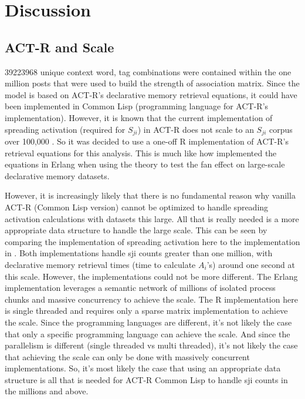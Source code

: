 \documentclass[10pt,letterpaper]{article}
\begin{document}
\section{Discussion}

\subsection{ACT-R and Scale}
\num{39223968} unique context word, tag combinations were contained within the one million posts that were used to build the strength of association matrix.
Since the model is based on ACT-R's declarative memory retrieval equations, it could have been implemented in Common Lisp (programming language for ACT-R's implementation).
However, it is known that the current implementation of spreading activation (required for $S_{ji}$) in ACT-R does not scale to an $S_{ji}$ corpus over 100,000 \cite{Douglass2010, Douglass2009}.
So it was decided to use a one-off R implementation of ACT-R's retrieval equations for this analysis.
This is much like how  implemented the equations in Erlang when using the theory to test the fan effect on large-scale declarative memory datasets.

However, it is increasingly likely that there is no fundamental reason why vanilla ACT-R (Common Lisp version) cannot be optimized to handle spreading activation calculations with datasets this large.
All that is really needed is a more appropriate data structure to handle the large scale.
This can be seen by comparing the implementation of spreading activation here to the implementation in .
Both implementations handle sji counts greater than one million, with declarative memory retrieval times (time to calculate $A_{i}$'s) around one second at this scale.
However, the implementations could not be more different.
The Erlang implementation leverages a semantic network of millions of isolated process chunks and massive concurrency to achieve the scale.
The R implementation here is single threaded and requires only a sparse matrix implementation to achieve the scale.
Since the programming languages are different, it's not likely the case that only a specific programming language can achieve the scale.
And since the parallelism is different (single threaded vs multi threaded), it's not likely the case that achieving the scale can only be done with massively concurrent implementations.
So, it's most likely the case that using an appropriate data structure is all that is needed for ACT-R Common Lisp to handle sji counts in the millions and above.
\end{document}
